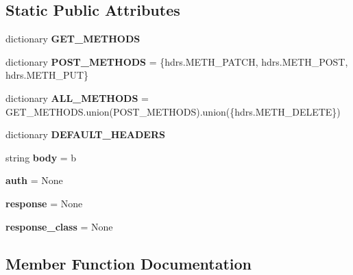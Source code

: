 \subsection*{Static Public Attributes}
\begin{DoxyCompactItemize}
\item 
dictionary {\bfseries G\+E\+T\+\_\+\+M\+E\+T\+H\+O\+DS}
\item 
\mbox{\label{classaiohttp_1_1client__reqrep_1_1_client_request_a65f844937ae25912cb9ab146340373c7}} 
dictionary {\bfseries P\+O\+S\+T\+\_\+\+M\+E\+T\+H\+O\+DS} = \{hdrs.\+M\+E\+T\+H\+\_\+\+P\+A\+T\+CH, hdrs.\+M\+E\+T\+H\+\_\+\+P\+O\+ST, hdrs.\+M\+E\+T\+H\+\_\+\+P\+UT\}
\item 
\mbox{\label{classaiohttp_1_1client__reqrep_1_1_client_request_add1505d618e35d1b4079623868b8c445}} 
dictionary {\bfseries A\+L\+L\+\_\+\+M\+E\+T\+H\+O\+DS} = G\+E\+T\+\_\+\+M\+E\+T\+H\+O\+D\+S.\+union(P\+O\+S\+T\+\_\+\+M\+E\+T\+H\+O\+DS).union(\{hdrs.\+M\+E\+T\+H\+\_\+\+D\+E\+L\+E\+TE\})
\item 
dictionary {\bfseries D\+E\+F\+A\+U\+L\+T\+\_\+\+H\+E\+A\+D\+E\+RS}
\item 
\mbox{\label{classaiohttp_1_1client__reqrep_1_1_client_request_aaa987eb5f646172db09c9e9c3073a3e9}} 
string {\bfseries body} = b\textquotesingle{}\textquotesingle{}
\item 
\mbox{\label{classaiohttp_1_1client__reqrep_1_1_client_request_a6d24119c11bc8f11bffb6974bc71a8d0}} 
{\bfseries auth} = None
\item 
\mbox{\label{classaiohttp_1_1client__reqrep_1_1_client_request_a9f5a2631c9db824a88f00057e0dbd910}} 
{\bfseries response} = None
\item 
\mbox{\label{classaiohttp_1_1client__reqrep_1_1_client_request_aa17961643f7e23686043395bf3ac4ce2}} 
{\bfseries response\+\_\+class} = None
\end{DoxyCompactItemize}


\subsection{Member Function Documentation}
\mbox{\label{classaiohttp_1_1client__reqrep_1_1_client_request_a9be160b7c3f43bdb8b2ffe832c9bb7a1}} 
